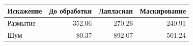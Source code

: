 \begin{tabular}{lrrr}\toprule
Искажение & До обработки & Лапласиан & Маскирование \\
\midrule
Размытие & 352.06 & 270.26 & 240.91 \\
Шум & 80.37 & 892.07 & 501.24 \\
\bottomrule\end{tabular}
